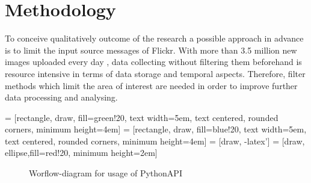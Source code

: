 \section{Methodology}
To conceive qualitatively outcome of the research a possible approach in advance is to limit the input source messages of Flickr. With more than 3.5 million new images uploaded every day \cite{(The Verge, 20 March 2013)}, data collecting without filtering them beforehand is resource intensive in terms of data storage and temporal aspects. Therefore, filter methods which limit the area of interest are needed in order to improve further data processing and analysing.
 
 = [rectangle, draw, fill=green!20, 
    text width=5em, text centered, rounded corners, minimum height=4em]
 = [rectangle, draw, fill=blue!20, 
    text width=5em, text centered, rounded corners, minimum height=4em]
 = [draw, -latex']
 = [draw, ellipse,fill=red!20,
    minimum height=2em]
    
\begin{figure}[h]
\caption{Worflow-diagram for usage of PythonAPI}
\end{figure}


